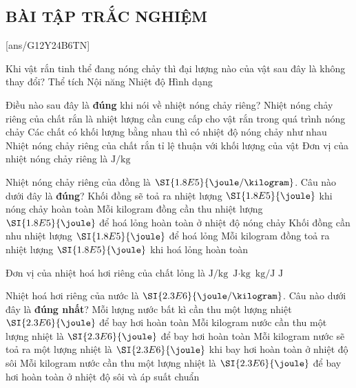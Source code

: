 \subsection{BÀI TẬP TRẮC NGHIỆM}
\setcounter{ex}{0}
[ans/G12Y24B6TN]		
\begin{ex}
Khi vật rắn tinh thể đang nóng chảy thì đại lượng nào của vật sau đây là không thay đổi?	
\choice
{Thể tích}
{Nội năng}
{\True Nhiệt độ}
{Hình dạng}
\loigiai{}
\end{ex}
\begin{ex}
	Điều nào sau đây là \textbf{đúng} khi nói về nhiệt nóng chảy riêng?
	\choice
	{Nhiệt nóng chảy riêng của chất rắn là nhiệt lượng cần cung cấp cho vật rắn trong quá trình nóng chảy}
	{Các chất có khối lượng bằng nhau thì có nhiệt độ nóng chảy như nhau}
	{Nhiệt nóng chảy riêng của chất rắn tỉ lệ thuận với khối lượng của vật}
	{\True Đơn vị của nhiệt nóng chảy riêng là $\si{\joule/\kilogram}$}
	\loigiai{}
\end{ex}
\begin{ex}
	Nhiệt nóng chảy riêng của đồng là $\SI{1.8E5}{\joule/\kilogram}$. Câu nào dưới đây là \textbf{đúng}?
	\choice
	{Khối đồng sẽ toả ra nhiệt lượng $\SI{1.8E5}{\joule}$ khi nóng chảy hoàn toàn}
	{\True Mỗi kilogram đồng cần thu nhiệt lượng $\SI{1.8E5}{\joule}$ để hoá lỏng hoàn toàn ở nhiệt độ nóng chảy}
	{Khối đồng cần nhu nhiệt lượng $\SI{1.8E5}{\joule}$ để hoá lỏng}
	{Mỗi kilogram đồng toả ra nhiệt lượng $\SI{1.8E5}{\joule}$ khi hoá lỏng hoàn toàn}
	\loigiai{}
\end{ex}
\begin{ex}
	Đơn vị của nhiệt hoá hơi riêng của chất lỏng là
	\choice
	{\True $\si{\joule/\kilogram}$}
	{$\si{\joule\cdot\kilogram}$}
	{$\si{\kilogram/\joule}$}
	{$\si{\joule}$}
	\loigiai{}
\end{ex}
\begin{ex}
	Nhiệt hoá hơi riêng của nước là $\SI{2.3E6}{\joule/\kilogram}$. Câu nào dưới đây là \textbf{đúng nhất}?
	\choice
	{Mỗi lượng nước bất kì cần thu một lượng nhiệt $\SI{2.3E6}{\joule}$ để bay hơi hoàn toàn}
	{Mỗi kilogram nước cần thu một lượng nhiệt là $\SI{2.3E6}{\joule}$ để bay hơi hoàn toàn}
	{Mỗi kilogram nước sẽ toả ra một lượng nhiệt là $\SI{2.3E6}{\joule}$ khi bay hơi hoàn toàn ở nhiệt độ sôi}
	{\True Mỗi kilogram nước cần thu một lượng nhiệt là $\SI{2.3E6}{\joule}$ để bay hơi hoàn toàn ở nhiệt độ sôi và áp suất chuẩn}
	\loigiai{}
\end{ex}
